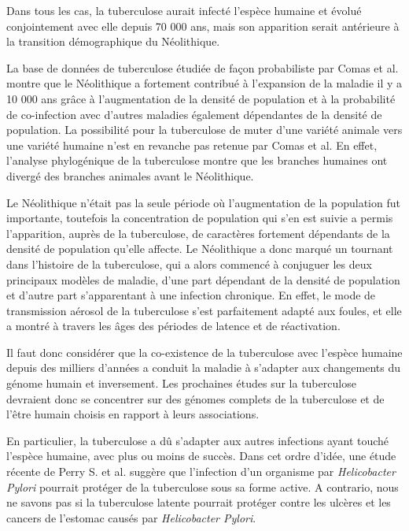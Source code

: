 \documentclass[twoside,a4paper,11pt,frenchb,openany]{report}
\begin{document}

Dans tous les cas, la tuberculose aurait infecté l'espèce humaine et évolué conjointement avec elle depuis 70 000 ans, mais son apparition serait antérieure à la transition démographique du Néolithique.

La base de données de tuberculose étudiée de façon probabiliste par Comas et al.\cite{comas} montre que le Néolithique a fortement contribué à l'expansion de la maladie il y a 10 000 ans grâce à l'augmentation de la densité de population et à la probabilité de co-infection avec d'autres maladies également dépendantes de la densité de population. La possibilité pour la tuberculose de muter d'une variété animale vers une variété humaine n'est en revanche pas retenue par Comas et al. En effet, l'analyse phylogénique de la tuberculose montre que les branches humaines ont divergé des branches animales avant le Néolithique.

Le Néolithique n'était pas la seule période où l'augmentation de la population fut importante, toutefois la concentration de population qui s'en est suivie a permis l'apparition, auprès de la tuberculose, de caractères fortement dépendants de la densité de population qu'elle affecte. Le Néolithique a donc marqué un tournant dans l'histoire de la tuberculose, qui a alors commencé à conjuguer les deux principaux modèles de maladie, d'une part dépendant de la densité de population et d'autre part s'apparentant à une infection chronique. En effet, le mode de transmission aérosol de la tuberculose s'est parfaitement adapté aux foules, et elle a montré à travers les âges des périodes de latence et de réactivation.


Il faut donc considérer que la co-existence de la tuberculose avec l'espèce humaine depuis des milliers d'années a conduit la maladie à s'adapter aux changements du génome humain et inversement. Les prochaines études sur la tuberculose devraient donc se concentrer sur des génomes complets de la tuberculose et de l'être humain choisis en rapport à leurs associations.

En particulier, la tuberculose a dû s'adapter aux autres infections ayant touché l'espèce humaine, avec plus ou moins de succès. Dans cet ordre d'idée, une étude récente de Perry S. et al.\cite{perry1, perry2} suggère que l'infection d'un organisme par \textit{Helicobacter Pylori} pourrait protéger de la tuberculose sous sa forme active. A contrario, nous ne savons pas si la tuberculose latente pourrait protéger contre les ulcères et les cancers de l'estomac causés par \textit{Helicobacter Pylori}.
\end{document}
